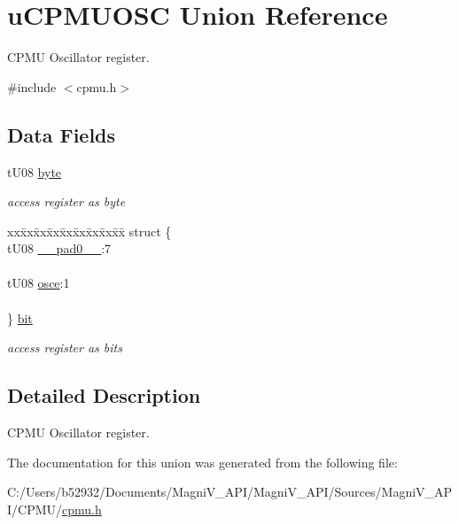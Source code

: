 \hypertarget{unionu_c_p_m_u_o_s_c}{}\section{u\+C\+P\+M\+U\+O\+S\+C Union Reference}
\label{unionu_c_p_m_u_o_s_c}


C\+P\+M\+U Oscillator register.  




{\ttfamily \#include $<$cpmu.\+h$>$}

\subsection*{Data Fields}
\begin{DoxyCompactItemize}
\item 
\hypertarget{unionu_c_p_m_u_o_s_c_aba308d63db050aed25cfd36c37e41ad4}{}t\+U08 \hyperlink{unionu_c_p_m_u_o_s_c_aba308d63db050aed25cfd36c37e41ad4}{byte}\label{unionu_c_p_m_u_o_s_c_aba308d63db050aed25cfd36c37e41ad4}

\begin{DoxyCompactList}\small\item\em access register as byte \end{DoxyCompactList}\item 
\hypertarget{unionu_c_p_m_u_o_s_c_ae117974fc156870d9814030954de15d2}{}\begin{tabbing}
xx\=xx\=xx\=xx\=xx\=xx\=xx\=xx\=xx\=\kill
struct \{\\
\>tU08 \hyperlink{unionu_c_p_m_u_o_s_c_aa3e5250d311ceb1525f9adf38f0d7982}{\_\_pad0\_\_}:7\\
\>\\
\>tU08 \hyperlink{unionu_c_p_m_u_o_s_c_a13abf9d03badb6dcb3ed01cae3a01d0c}{osce}:1\\
\>\\
\} \hyperlink{unionu_c_p_m_u_o_s_c_ae117974fc156870d9814030954de15d2}{bit}\label{unionu_c_p_m_u_o_s_c_ae117974fc156870d9814030954de15d2}
\\

\end{tabbing}\begin{DoxyCompactList}\small\item\em access register as bits \end{DoxyCompactList}\end{DoxyCompactItemize}


\subsection{Detailed Description}
C\+P\+M\+U Oscillator register. 

The documentation for this union was generated from the following file\+:\begin{DoxyCompactItemize}
\item 
C\+:/\+Users/b52932/\+Documents/\+Magni\+V\+\_\+\+A\+P\+I/\+Magni\+V\+\_\+\+A\+P\+I/\+Sources/\+Magni\+V\+\_\+\+A\+P\+I/\+C\+P\+M\+U/\hyperlink{cpmu_8h}{cpmu.\+h}\end{DoxyCompactItemize}
